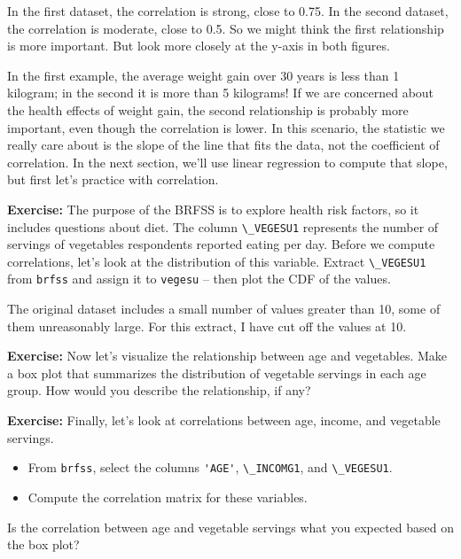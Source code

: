 In the first dataset, the correlation is strong, close to 0.75. In the
second dataset, the correlation is moderate, close to 0.5. So we might
think the first relationship is more important. But look more closely at
the y-axis in both figures.

In the first example, the average weight gain over 30 years is less than
1 kilogram; in the second it is more than 5 kilograms! If we are
concerned about the health effects of weight gain, the second
relationship is probably more important, even though the correlation is
lower. In this scenario, the statistic we really care about is the slope
of the line that fits the data, not the coefficient of correlation. In
the next section, we'll use linear regression to compute that slope, but
first let's practice with correlation.

\textbf{Exercise:} The purpose of the BRFSS is to explore health risk
factors, so it includes questions about diet. The column
\passthrough{\lstinline!\_VEGESU1!} represents the number of servings of
vegetables respondents reported eating per day. Before we compute
correlations, let's look at the distribution of this variable. Extract
\passthrough{\lstinline!\_VEGESU1!} from \passthrough{\lstinline!brfss!}
and assign it to \passthrough{\lstinline!vegesu!} -- then plot the CDF
of the values.

The original dataset includes a small number of values greater than 10,
some of them unreasonably large. For this extract, I have cut off the
values at 10.

\textbf{Exercise:} Now let's visualize the relationship between age and
vegetables. Make a box plot that summarizes the distribution of
vegetable servings in each age group. How would you describe the
relationship, if any?

\textbf{Exercise:} Finally, let's look at correlations between age,
income, and vegetable servings.

\begin{itemize}

\item
  From \passthrough{\lstinline!brfss!}, select the columns
  \passthrough{\lstinline!'AGE'!}, \passthrough{\lstinline!\_INCOMG1!},
  and \passthrough{\lstinline!\_VEGESU1!}.
\item
  Compute the correlation matrix for these variables.
\end{itemize}

Is the correlation between age and vegetable servings what you expected
based on the box plot?

